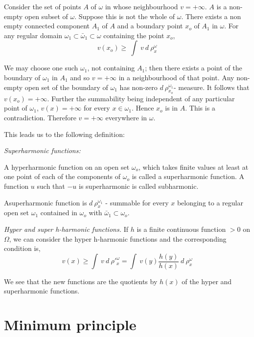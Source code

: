 Consider the set of points $A$ of $\omega$ in whose neighbourhood $v =
+ \infty$. $A$ is a non-empty open subset of $\omega$. Suppose this is
not the whole of $\omega$. There exists a non empty connected
component $A_1$ of $A$ and a boundary point $x_o$ of $A_1$ in
$\omega$. For any regular domain $\omega_1 \subset \bar{\omega}_1
\subset \omega$ containing the point $x_o$,  
$$
v(x_o) \ge ~ \int ~ v ~ d ~ \rho^\omega_x
$$

We may choose one such $\omega_1$, not containing $A_1$; then there
exists a point of the boundary of $\omega_1$ in $A_1$ and so $v = +
\infty$ in a neighbourhood of that point. Any non-empty open set of
the boundary of $\omega_1$ has non-zero $d ~ \rho^{\omega_1}_{x_o}$-
measure. It follows that $v(x_o) = + \infty$. Further the summability
being independent of any particular point of $\omega_1$, $v(x) = +
\infty$ for every $x \in \omega_1$. Hence $x_o$ is in $A$. This is a
contradiction. Therefore $v = + \infty$ everywhere in $\omega$. 

This leads us to the following definition:

\begin{defn}\label{p4:chap2:sec6:def2} %
  {\em Superharmonic functions:}

  A hyperharmonic function on an open set $\omega_o$, which takes
  finite values at least at one point of each of the components of
  $\omega_o$ is called a superharmonic function. A function $u$ such
  that $-u$ is superharmonic is called subharmonic. 
\end{defn} 

A\pageoriginale superharmonic function is $d ~\rho^{\omega_1}_x$ - summable for
every $x$ belonging to a regular open set $\omega_1$ contained in
$\omega_o$ with $\bar{\omega}_1 \subset \omega_o$. 

\begin{defn}\label{p4:chap2:sec6:def6}%
  {\em Hyper and super h-harmonic functions.} If $h$ is a finite
  continuous function $> 0$ on $\Omega$, we can consider the hyper
  h-harmonic functions and the corresponding condition is, 
  $$
  v(x) \ge \int ~ v ~ d ~ \rho'^\omega_x = \int ~ v(y)
  \frac{h(y)}{h(x)} ~ d ~\rho^\omega_x 
  $$
\end{defn}

We see that the new functions are the quotients by $h(x)$ of the hyper
and superharmonic functions. 
 
\setcounter{section}{7}
\section{Minimum principle}\label{p4:chap2:sec8}%

